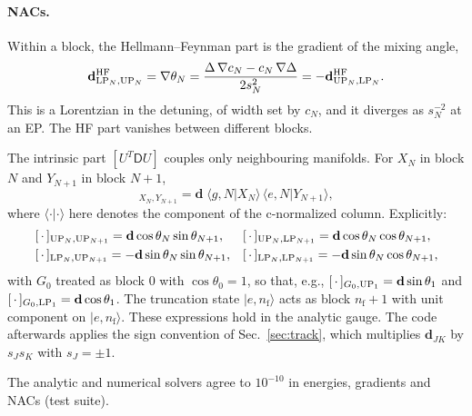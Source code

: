 \documentclass[11pt]{article}
\newcommand{\ket}[1]{\lvert #1 \rangle}
\newcommand{\grad}{\nabla}
\newcommand{\dd}{\mathbf{d}}
\newcommand{\Dm}{\mathsf{D}}
\newcommand{\nf}{n_{\mathrm f}}
\begin{document}
\paragraph{NACs.} Within a block, the Hellmann--Feynman part is the gradient of the mixing angle,
\begin{equation}
\dd^{\rm HF}_{{\rm LP}_N,{\rm UP}_N}=\grad\theta_N=\frac{\Delta\,\grad c_N-c_N\,\grad\Delta}{2s_N^2}=-\dd^{\rm HF}_{{\rm UP}_N,{\rm LP}_N}.
\end{equation}
This is a Lorentzian in the detuning, of width set by $c_N$, and it diverges as $s_N^{-2}$ at an EP. The HF part vanishes between different blocks.

The intrinsic part $[U^T\Dm U]$ couples only neighbouring manifolds. For $X_N$ in block $N$ and $Y_{N+1}$ in block $N+1$,
\begin{equation}
[U^T\Dm U]_{X_N,Y_{N+1}}=\dd\;\langle g,N|X_N\rangle\,\langle e,N|Y_{N+1}\rangle ,
\end{equation}
where $\langle\cdot|\cdot\rangle$ here denotes the component of the c-normalized column. Explicitly:
\begin{align}
&[\,\cdot\,]_{{\rm UP}_N,{\rm UP}_{N+1}}=\dd\cos\theta_N\sin\theta_{N+1}, &&[\,\cdot\,]_{{\rm UP}_N,{\rm LP}_{N+1}}=\dd\cos\theta_N\cos\theta_{N+1},\\
&[\,\cdot\,]_{{\rm LP}_N,{\rm UP}_{N+1}}=-\dd\sin\theta_N\sin\theta_{N+1}, &&[\,\cdot\,]_{{\rm LP}_N,{\rm LP}_{N+1}}=-\dd\sin\theta_N\cos\theta_{N+1},
\end{align}
with $G_0$ treated as block 0 with $\cos\theta_0=1$, so that, e.g., $[\,\cdot\,]_{G_0,{\rm UP}_1}=\dd\sin\theta_1$ and $[\,\cdot\,]_{G_0,{\rm LP}_1}=\dd\cos\theta_1$. The truncation state $\ket{e,\nf}$ acts as block $\nf+1$ with unit component on $\ket{e,\nf}$. These expressions hold in the analytic gauge. The code afterwards applies the sign convention of Sec.~\ref{sec:track}, which multiplies $\dd_{JK}$ by $s_Js_K$ with $s_J=\pm1$.

The analytic and numerical solvers agree to $10^{-10}$ in energies, gradients and NACs (test suite).

\end{document}
